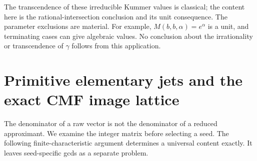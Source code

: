 \documentclass[11pt,a4paper]{article}
\theoremstyle{definition}
\theoremstyle{remark}
\numberwithin{equation}{section}
\begin{document}
The transcendence of these irreducible Kummer values is classical;
the content here is the rational-intersection conclusion and its
unit consequence.  The parameter exclusions are material.  For
example, $M(b,b,\alpha)=e^\alpha$ is a unit, and terminating cases can give
algebraic values.  No conclusion about the irrationality or
transcendence of $\gamma$ follows from this application.

\section{Primitive elementary jets and the exact CMF image lattice}
\label{p5:sec:primitive-cmf-jet}

The denominator of a raw vector is not the denominator of a reduced
approximant. We examine the integer matrix before selecting a seed.
The following finite-characteristic argument determines a universal
content exactly. It leaves seed-specific gcds as a separate problem.
\end{document}
